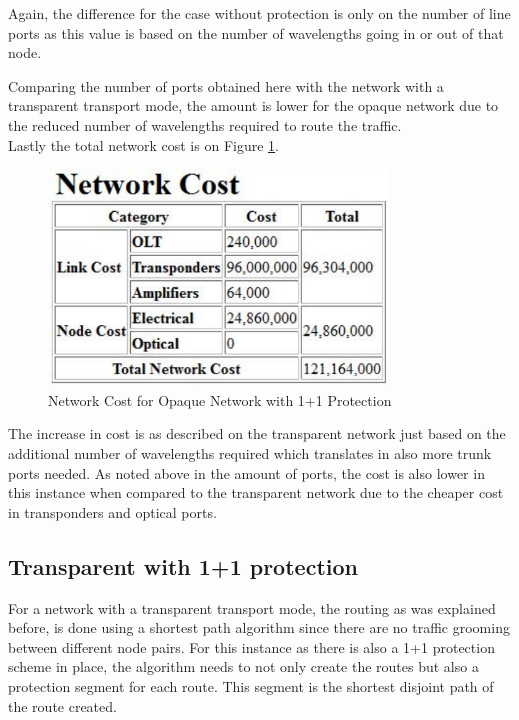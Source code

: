 	Again, the difference for the case without protection is only on the number of line ports as this value is based on the number of wavelengths going in or out of that node.
	
	Comparing the number of ports obtained here with the network with a transparent transport mode, the amount is lower for the opaque network due to the reduced number of wavelengths required to route the traffic. \\
	
	Lastly the total network cost is on Figure \ref{networkCost_Report_Cost_Opaque11}.\\
	
	\begin{figure}[!h]
		\centering
		\includegraphics[width=9cm]{networkCost_Report_Cost_Opaque11.pdf}	
		\caption{Network Cost for Opaque Network with 1+1 Protection}
		\label{networkCost_Report_Cost_Opaque11}								
	\end{figure}	
	
	\pagebreak
	
	The increase in cost is as described on the transparent network just based on the additional number of wavelengths required which translates in also more trunk ports needed. As noted above in the amount of ports, the cost is also lower in this instance when compared to the transparent network due to the cheaper cost in transponders and optical ports.
	
	
	
		\subsection*{Transparent with 1+1 protection}
		
		
		For a network with a transparent transport mode, the routing as was explained before, is done using a shortest path algorithm since there are no traffic grooming between different node pairs. For this instance as there is also a 1+1 protection scheme in place, the algorithm needs to not only create the routes but also a protection segment for each route. This segment is the shortest disjoint path of the route created.

